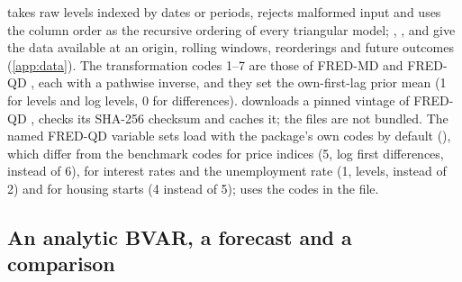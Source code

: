  takes raw levels indexed by dates or periods, rejects
malformed input and uses the column order as the recursive ordering of every triangular model;
, ,  and  give the data available at an origin,
rolling windows, reorderings and future outcomes (\cref{app:data}).
The transformation codes 1--7 are those of FRED-MD and FRED-QD \citep{mccracken2016fredmd,mccracken2021fredqd}, each
with a pathwise inverse, and they set the own-first-lag prior mean (1 for levels and log levels,
0 for differences).
 downloads a pinned vintage of FRED-QD
\citep{mccracken2021fredqd}, checks its SHA-256 checksum and caches it; the files are not bundled.
The named FRED-QD variable sets load with the package's own codes by default
(), which differ from the benchmark codes
\citep[Table~A1]{mccracken2021fredqd} for price indices (5, log first differences, instead of 6),
for interest rates and the unemployment rate (1, levels, instead of 2) and for housing starts (4
instead of 5);  uses the codes in the file.

\subsection{An analytic BVAR, a forecast and a comparison}\label{sec:walk-analytic}




